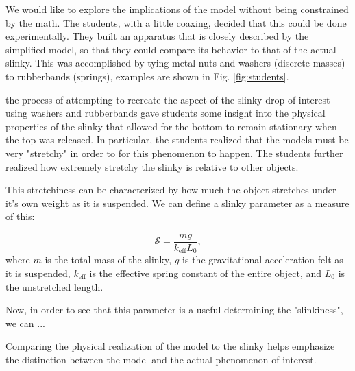 \documentclass[aps,pre,10pt,superscriptaddress,showpacs,amsmath,amssymb,nofootinbib]{revtex4-1}
\newcommand{\FIGstudents}{
\begin{figure}[t]\center
\texttt{[image: FIGstudents.pdf]}
\caption{\label{fig:students} Students from the 2012 Compass Project summer program with model slinkies built out of washers and rubberbands.}
\end{figure}
}
\begin{document}
We would like to explore the implications of the model without being constrained by the math.  
The students, with a little coaxing, decided that this could be done experimentally.  They built an 
apparatus that is closely described by the simplified model, so that they could compare its behavior to that of the 
actual slinky.  This was accomplished by tying metal nuts and washers (discrete masses) to 
rubberbands (springs), examples are shown in Fig. \ref{fig:students}.  


the process of attempting to recreate the aspect of the slinky drop of interest using washers and rubberbands  
gave students some insight into the physical properties of the slinky that allowed for the bottom to  remain 
stationary when the top was released.  In particular, the students realized that the models must be very "stretchy"
in order to for this phenomenon to happen.  The students further realized how extremely stretchy the slinky is 
relative to other objects.

This stretchiness can be characterized by how much the object stretches
under it's own weight as it is suspended.   We can define a slinky parameter as a measure of this:

\begin{equation}
\mathcal{S}=\frac{m g}{k_\text{eff} L_0 },
\end{equation}
where $m$ is the total mass of the slinky, $g$ is the gravitational acceleration felt as it is suspended, $k_\text{eff}$ is 
the effective spring constant of the entire object, and $L_0$ is the unstretched length.  

Now, in order to see that this parameter is a useful determining the "slinkiness", we can ...


Comparing the physical realization of the model to the slinky 
helps emphasize the distinction between the model and the actual phenomenon of interest.
\end{document}
